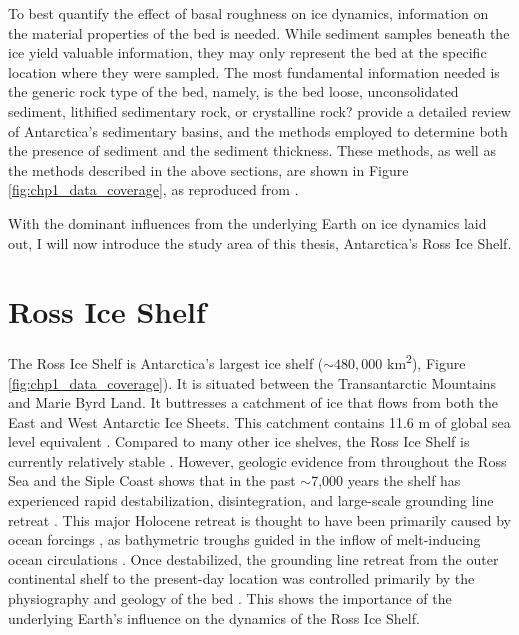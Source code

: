 To best quantify the effect of basal roughness on ice dynamics, information on the material properties of the bed is needed. While sediment samples beneath the ice yield valuable information, they may only represent the bed at the specific location where they were sampled. The most fundamental information needed is the generic rock type of the bed, namely, is the bed loose, unconsolidated sediment, lithified sedimentary rock, or crystalline rock? \citet{aitkenantarctica2023} provide a detailed review of Antarctica's sedimentary basins, and the methods employed to determine both the presence of sediment and the sediment thickness. These methods, as well as the methods described in the above sections, are shown in Figure \ref{fig:chp1_data_coverage}, as reproduced from \citet{aitkenantarctica2023}. 

With the dominant influences from the underlying Earth on ice dynamics laid out, I will now introduce the study area of this thesis, Antarctica's Ross Ice Shelf. 


\section{Ross Ice Shelf}

The Ross Ice Shelf is Antarctica's largest ice shelf ($\sim480,000$ km\textsuperscript{2}), Figure \ref{fig:chp1_data_coverage}). It is situated between the Transantarctic Mountains and Marie Byrd Land. It buttresses a catchment of ice that flows from both the East and West Antarctic Ice Sheets. This catchment contains 11.6 m of global sea level equivalent \citep{fretwellbedmap22013, rignotantarctic2011, tintoross2019}. Compared to many other ice shelves, the Ross Ice Shelf is currently relatively stable \citep{moholdtbasal2014, rignoticeshelf2013}. However, geologic evidence from throughout the Ross Sea and the Siple Coast shows that in the past $\sim$7,000 years the shelf has experienced rapid destabilization, disintegration, and large-scale grounding line retreat \citep[e.g.,][]{venturellimid2020, naishobliquitypaced2009}. This major Holocene retreat is thought to have been primarily caused by ocean forcings \citep{lowrydeglacial2019}, as bathymetric troughs guided in the inflow of melt-inducing ocean circulations \citep{tintoross2019}. Once destabilized, the grounding line retreat from the outer continental shelf to the present-day location was controlled primarily by the physiography and geology of the bed \citep{halberstadticesheet2016, andersonseismic2019}. This shows the importance of the underlying Earth's influence on the dynamics of the Ross Ice Shelf. 

